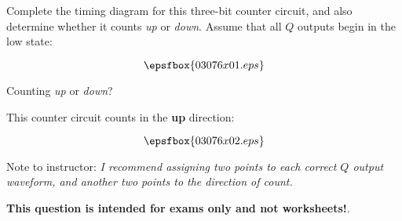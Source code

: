 

Complete the timing diagram for this three-bit counter circuit, and also determine whether it counts {\it up} or {\it down}.  Assume that all $Q$ outputs begin in the low state:

$$\epsfbox{03076x01.eps}$$

Counting {\it up} or {\it down}?







This counter circuit counts in the {\bf up} direction:

$$\epsfbox{03076x02.eps}$$

Note to instructor: {\it I recommend assigning two points to each correct $Q$ output waveform, and another two points to the direction of count.}







{\bf This question is intended for exams only and not worksheets!}.




